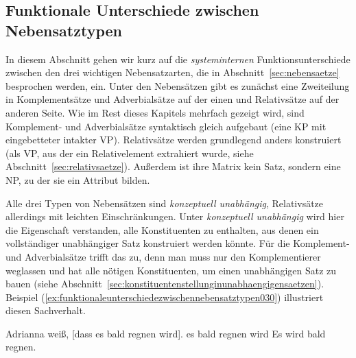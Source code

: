 \subsection{Funktionale Unterschiede zwischen Nebensatztypen}
\label{sec:funktionaleunterschiedezwischennebensatztypen}

In diesem Abschnitt gehen wir kurz auf die \textit{systeminternen} Funktionsunterschiede zwischen den drei wichtigen Nebensatzarten, die in Abschnitt~\ref{sec:nebensaetze} besprochen werden, ein.
Unter den Nebensätzen gibt es zunächst eine Zweiteilung in Komplementsätze und Adverbialsätze auf der einen und Relativsätze auf der anderen Seite.
Wie im Rest dieses Kapitels mehrfach gezeigt wird, sind Komplement- und Adverbialsätze syntaktisch gleich aufgebaut (eine KP mit eingebetteter intakter VP).
Relativsätze werden grundlegend anders konstruiert (als VP, aus der ein Relativelement extrahiert wurde, siehe Abschnitt~\ref{sec:relativsaetze}).
Außerdem ist ihre Matrix kein Satz, sondern eine NP, zu der sie ein Attribut bilden.


Alle drei Typen von Nebensätzen sind \textit{konzeptuell unabhängig}, Relativsätze allerdings mit leichten Einschränkungen.
Unter \textit{konzeptuell unabhängig} wird hier die Eigenschaft verstanden, alle Konstituenten zu enthalten, aus denen ein vollständiger unabhängiger Satz konstruiert werden könnte.
Für die Komplement- und Adverbialsätze trifft das zu, denn man muss nur den Komplementierer weglassen und hat alle nötigen Konstituenten, um einen unabhängigen Satz zu bauen (siehe Abschnitt~\ref{sec:konstituentenstellunginunabhaengigensaetzen}).
Beispiel (\ref{ex:funktionaleunterschiedezwischennebensatztypen030}) illustriert diesen Sachverhalt.

\begin{exe}
  \ex\label{ex:funktionaleunterschiedezwischennebensatztypen030}
  \begin{xlist}
    \ex\label{ex:funktionaleunterschiedezwischennebensatztypen031} Adrianna weiß, [dass es bald regnen wird].
    \ex\label{ex:funktionaleunterschiedezwischennebensatztypen032} es bald regnen wird
    \ex\label{ex:funktionaleunterschiedezwischennebensatztypen033} Es wird bald regnen.
  \end{xlist}
\end{exe}

